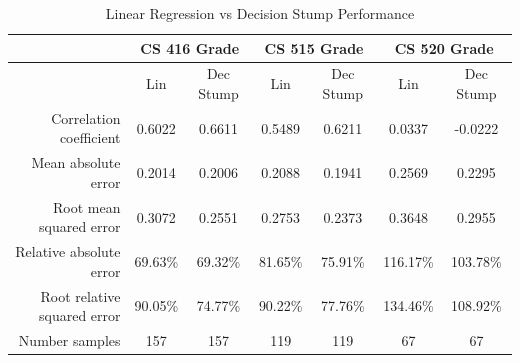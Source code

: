 \documentclass[letterpaper,11pt]{article}
\begin{document}
\begin{table}[h!]
\begin{center}

  \begin{tabular}{r|c|c|c|c|c|c|}
          & \multicolumn{2}{|c|}{CS 416 Grade}& \multicolumn{2}{|c|}{CS 515 Grade}& \multicolumn{2}{|c|}{CS 520 Grade} \\ \hline
                              & Lin     & Dec Stump& Lin     & Dec Stump & Lin        & Dec Stump\\ \hline
Correlation coefficient       & 0.6022  & 0.6611   & 0.5489  & 0.6211    & 0.0337     & -0.0222  \\
Mean absolute error           & 0.2014  & 0.2006   & 0.2088  & 0.1941    & 0.2569     & 0.2295   \\
Root mean squared error       & 0.3072  & 0.2551   & 0.2753  & 0.2373    & 0.3648     & 0.2955   \\
Relative absolute error       & 69.63\% & 69.32\%  & 81.65\% & 75.91\%   & 116.17\%   & 103.78\%  \\
Root relative squared error   & 90.05\% & 74.77\%  & 90.22\% & 77.76\%   & 134.46\%   & 108.92\% \\
Number samples                & 157     & 157      & 119     & 119       & 67         & 67       \\
  \end{tabular}
\end{center}
  \caption {Linear Regression vs Decision Stump Performance}
\label{table:linperform}
\end{table}
\end{document}
